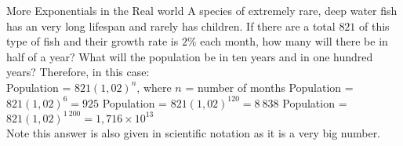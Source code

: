 \begin{wex}{More Exponentials in the Real world} 
{A species of extremely rare, deep water fish has an very long lifespan and rarely has children. If there are a total $821$ of this type of fish and their growth rate is $2\%$ each month, how many will there be in half of a year? What will the population be in ten years and in one hundred years?}{
Therefore, in this case:\\
Population = $821(1,02)^n$,   where $n$ = number of months
Population = $821(1,02)^6 = 925$
Population = $821(1,02)^{120} = 8~838$
Population = $821(1,02)^{1~200} = 1,716 \times 10^{13}$\\
Note this answer is also given in scientific notation as it is a very big number.}
\end{wex}

